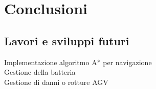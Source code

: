 \documentclass[12pt]{article}
\begin{document}
\newpage
\section{Conclusioni}

\subsection{Lavori e sviluppi futuri}
Implementazione algoritmo A* per navigazione \\
Gestione della batteria \\
Gestione di danni o rotture AGV

\newpage


\end{document}
